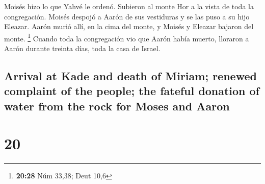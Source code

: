 \begin{paracol}{2}
 Moisés hizo lo que Yahvé le ordenó. Subieron al monte
Hor a la vista de toda la congregación.  Moisés despojó a
Aarón de sus vestiduras y se las puso a su hijo Eleazar. Aarón murió
allí, en la cima del monte, y Moisés y Eleazar bajaron del monte.
\footnote{\textbf{20:28} Núm 33,38; Deut 10,6}  Cuando
toda la congregación vio que Aarón había muerto, lloraron a Aarón
durante treinta días, toda la casa de Israel.

\switchcolumn
\begin{otherlanguage}{english}

\hypertarget{arrival-at-kade-and-death-of-miriam-renewed-complaint-of-the-people-the-fateful-donation-of-water-from-the-rock-for-moses-and-aaron}{%
\subsection{Arrival at Kade and death of Miriam; renewed complaint of
the people; the fateful donation of water from the rock for Moses and
Aaron}\label{arrival-at-kade-and-death-of-miriam-renewed-complaint-of-the-people-the-fateful-donation-of-water-from-the-rock-for-moses-and-aaron}}

\hypertarget{section-39}{%
\section{20}\label{section-39}}


\end{otherlanguage}
\end{paracol}
